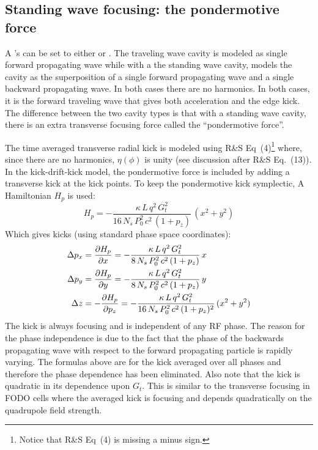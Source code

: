 \subsection{Standing wave focusing: the pondermotive force}

A 's  can be set to either  or
. The traveling wave cavity is modeled as single forward propagating wave while
with a the standing wave cavity, \bmad models the cavity as the superposition of a single forward
propagating wave and a single backward propagating wave. In both cases there are no harmonics.  In
both cases, it is the forward traveling wave that gives both acceleration and the edge kick.  The
difference between the two cavity types is that with a standing wave cavity, there is an extra
transverse focusing force called the ``pondermotive force''.

The time averaged transverse radial kick is modeled using R\&S Eq~(4)\footnote
  {
Notice that R\&S Eq~(4) is missing a minus sign.
  }
where, since there are no harmonics, $\eta(\phi)$ is unity (see discussion after R\&S Eq.~(13)).  In
the \bmad kick-drift-kick model, the pondermotive force is included by adding a transverse kick at
the kick points. To keep the pondermotive kick symplectic, A Hamiltonian $H_p$ is used:
\begin{equation}
  H_p = -\frac{\kappa \, L \, q^2 \, G_t^2}{16 \, N_s \, P_0^2 \, c^2 \, (1 + p_z)} \, (x^2 + y^2)
\end{equation}
Which gives kicks (using standard \bmad phase space coordinates):
\begin{align}
  \Delta p_x &= \frac{\partial H_p}{\partial x} 
              = -\frac{\kappa \, L \, q^2 \, G_t^2}{8 \, N_s \, P_0^2 \, c^2 \, (1 + p_z)} \, x \nonumber \\
  \Delta p_y &= \frac{\partial H_p}{\partial y} 
              = -\frac{\kappa \, L \, q^2 \, G_t^2}{8 \, N_s \, P_0^2 \, c^2 \, (1 + p_z)} \, y \\
  \Delta z &= -\frac{\partial H_p}{\partial p_z} 
              = -\frac{\kappa \, L \, q^2 \, G_t^2}{16 \, N_s \, P_0^2 \, c^2 \, (1 + p_z)^2} \, (x^2 + y^2) \nonumber
\end{align}
The kick is always focusing and is independent of any RF phase. The reason for the phase
independence is due to the fact that the phase of the backwards propagating wave with respect to the
forward propagating particle is rapidly varying. The formulas above are for the kick averaged over
all phases and therefore the phase dependence has been eliminated. Also note that the kick is
quadratic in its dependence upon $G_t$. This is similar to the transverse focusing in FODO cells
where the averaged kick is focusing and depends quadratically on the quadrupole field strength.

